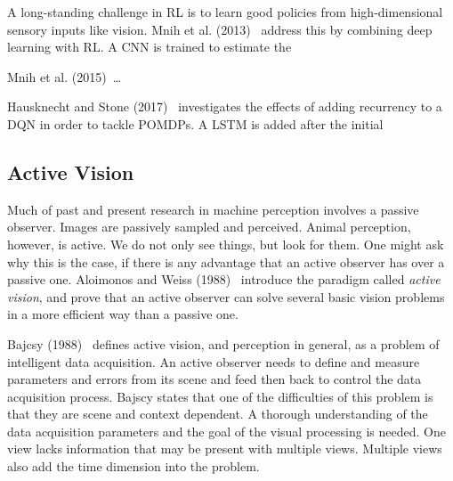 
A long-standing challenge in RL is to learn good policies from high-dimensional sensory inputs like vision.
Mnih et al. (2013)~\cite{mnih_atari_2013} address this by combining deep learning with RL.
A CNN is trained to estimate the 

Mnih et al. (2015)~\cite{mnih_human_2015}\dots %


Hausknecht and Stone (2017)~\cite{hausknecht_stone_2017} investigates the effects of adding recurrency to a DQN in order to tackle POMDPs.
A LSTM is added after the initial 


\subsection{Active Vision}
\label{sec:activevision}


Much of past and present research in machine perception involves a passive observer.
Images are passively sampled and perceived.
Animal perception, however, is active.
We do not only see things, but look for them.
One might ask why this is the case, if there is any advantage that an active observer has over a passive one.
Aloimonos and Weiss (1988)~\cite{aloimonos_active_1988} introduce the paradigm called \textit{active vision}, and prove that an active observer can solve several basic vision problems in a more efficient way than a passive one.

Bajcsy (1988)~\cite{bajcsy_1988} defines active vision, and perception in general, as a problem of intelligent data acquisition.
An active observer needs to define and measure parameters and errors from its scene and feed then back to control the data acquisition process.
Bajscy states that one of the difficulties of this problem is that they are scene and context dependent.
A thorough understanding of the data acquisition parameters and the goal of the visual processing is needed.
One view lacks information that may be present with multiple views.
Multiple views also add the time dimension into the problem.

